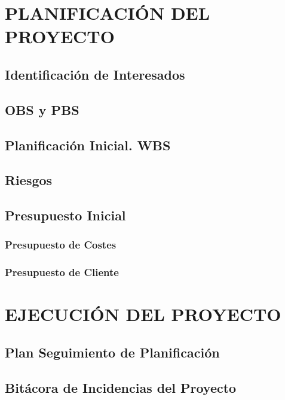 \section{PLANIFICACIÓN DEL PROYECTO}

\subsection{Identificación de Interesados}


\subsection{OBS y PBS}


\subsection{Planificación Inicial. WBS}


\subsection{Riesgos}





\subsection{Presupuesto Inicial}

\subsubsection{Presupuesto de Costes}

\subsubsection{Presupuesto de Cliente} 


\newpage
\section{EJECUCIÓN DEL PROYECTO}

\subsection{Plan Seguimiento de Planificación}

\subsection{Bitácora de Incidencias del Proyecto}

